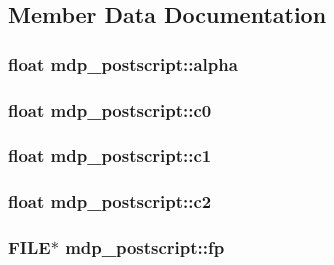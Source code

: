 \subsection{Member Data Documentation}
\hypertarget{classmdp__postscript_aca4cc1e7bee7fa702c643bdb1c69d6d0}{
\subsubsection[{alpha}]{\setlength{\rightskip}{0pt plus 5cm}float {\bf mdp\_\-postscript::alpha}}}
\label{classmdp__postscript_aca4cc1e7bee7fa702c643bdb1c69d6d0}
\hypertarget{classmdp__postscript_a3160a1940a9fa4e99a0b138bc88769e9}{
\subsubsection[{c0}]{\setlength{\rightskip}{0pt plus 5cm}float {\bf mdp\_\-postscript::c0}}}
\label{classmdp__postscript_a3160a1940a9fa4e99a0b138bc88769e9}
\hypertarget{classmdp__postscript_a92dc6ce50f362fe93a1981b9a126073a}{
\subsubsection[{c1}]{\setlength{\rightskip}{0pt plus 5cm}float {\bf mdp\_\-postscript::c1}}}
\label{classmdp__postscript_a92dc6ce50f362fe93a1981b9a126073a}
\hypertarget{classmdp__postscript_a26f42cf1f154707c463ecdd3f19f568f}{
\subsubsection[{c2}]{\setlength{\rightskip}{0pt plus 5cm}float {\bf mdp\_\-postscript::c2}}}
\label{classmdp__postscript_a26f42cf1f154707c463ecdd3f19f568f}
\hypertarget{classmdp__postscript_a0d313085dea47b974fdd18ecb26622f1}{
\subsubsection[{fp}]{\setlength{\rightskip}{0pt plus 5cm}FILE$\ast$ {\bf mdp\_\-postscript::fp}}}

